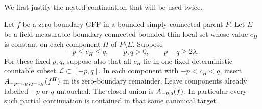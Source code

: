 We first justify the nested continuation that will be used twice.

\begin{lemma}
\label{lem:nested-completion}
Let \(f\) be a zero-boundary GFF in a bounded simply connected parent
\(P\). Let \(E\) be a field-measurable boundary-connected bounded thin
local set whose value \(c_H\) is constant on each component \(H\) of
\(P\setminus E\). Suppose
\[
       -p\le c_H\le q,\qquad p,q>0,\qquad p+q\ge2\lambda.
\]
For these fixed \(p,q\), suppose also that all \(c_H\) lie in one fixed
deterministic countable subset \(\mathcal L\subset[-p,q]\).
In each component with \(-p<c_H<q\), insert
\(A_{-p+c_H,q-c_H}(f^H)\) in its zero-boundary remainder.
Leave components already labelled \(-p\) or \(q\) untouched.
The closed union is \(A_{-p,q}(f)\). In particular every such
partial continuation is contained in that same canonical target.
\end{lemma}


